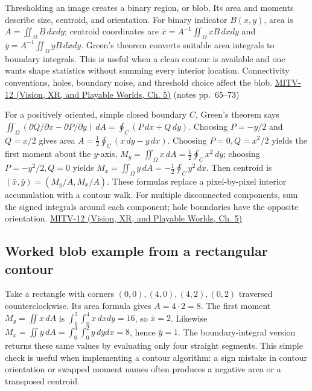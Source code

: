 Thresholding an image creates a binary region, or blob. Its area and moments describe size, centroid, and orientation. For binary indicator \(B(x,y)\), area is \(A=\iint_\Omega B\,dxdy\); centroid coordinates are \(\bar{x}=A^{-1}\iint_\Omega xB\,dxdy\) and \(\bar{y}=A^{-1}\iint_\Omega yB\,dxdy\). Green's theorem converts suitable area integrals to boundary integrals. This is useful when a clean contour is available and one wants shape statistics without summing every interior location. Connectivity conventions, holes, boundary noise, and threshold choice affect the blob. \href{../07-Vision-XR-and-Playable-Worlds/main.pdf\#nameddest=04-visual-computing-ii-ch036-mitv-12---blob-analysis-binary-image-processing-greens-theorem-derivative-and-integral}{MITV-12 (Vision, XR, and Playable Worlds, Ch. 5)} (notes pp.~65--73)

For a positively oriented, simple closed boundary \(C\), Green's theorem says \(\iint_\Omega(\partial Q/\partial x-\partial P/\partial y)\,dA=\oint_C(P\,dx+Q\,dy)\). Choosing \(P=-y/2\) and \(Q=x/2\) gives area \(A=\frac12\oint_C(x\,dy-y\,dx)\). Choosing \(P=0,Q=x^2/2\) yields the first moment about the \(y\)-axis, \(M_y=\iint_\Omega x\,dA=\frac12\oint_Cx^2\,dy\); choosing \(P=-y^2/2,Q=0\) yields \(M_x=\iint_\Omega y\,dA=-\frac12\oint_Cy^2\,dx\). Then centroid is \((\bar{x},\bar{y})=(M_y/A,M_x/A)\). These formulas replace a pixel-by-pixel interior accumulation with a contour walk. For multiple disconnected components, sum the signed integrals around each component; hole boundaries have the opposite orientation. \href{../07-Vision-XR-and-Playable-Worlds/main.pdf\#nameddest=04-visual-computing-ii-ch036-mitv-12---blob-analysis-binary-image-processing-greens-theorem-derivative-and-integral}{MITV-12 (Vision, XR, and Playable Worlds, Ch. 5)}

\subsection{Worked blob example from a rectangular contour}\label{04-visual-computing-ii-ch030-worked-blob-example-from-a-rectangular-contour}

\hypertarget{04-visual-computing-ii-ch030-worked-blob-example-from-a-rectangular-contour}{}

Take a rectangle with corners \((0,0),(4,0),(4,2),(0,2)\) traversed counterclockwise. Its area formula gives \(A=4\cdot2=8\). The first moment \(M_y=\iint x\,dA\) is \(\int_0^2\int_0^4x\,dxdy=16\), so \(\bar{x}=2\). Likewise \(M_x=\iint y\,dA=\int_0^4\int_0^2y\,dydx=8\), hence \(\bar{y}=1\). The boundary-integral version returns these same values by evaluating only four straight segments. This simple check is useful when implementing a contour algorithm: a sign mistake in contour orientation or swapped moment names often produces a negative area or a transposed centroid.

